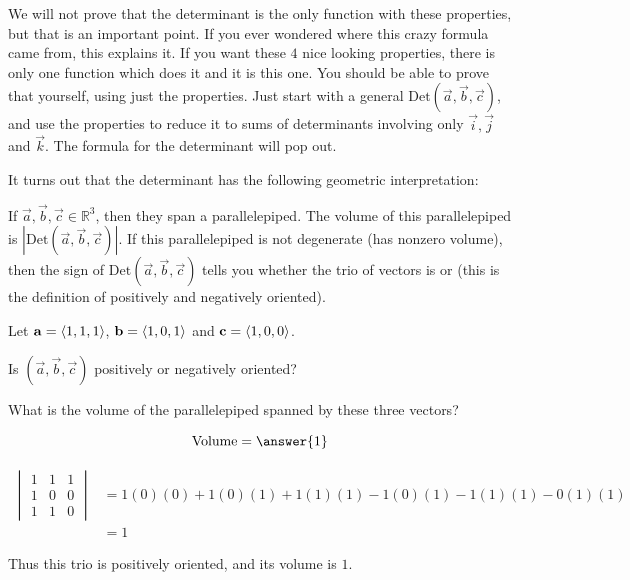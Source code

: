 \documentclass{ximera}
\begin{document}
	We will not prove that the determinant is the only function with these properties, but that is an important point.  If you ever wondered where this crazy formula came from, this explains it.  If you want these $4$ nice looking properties, there is only one function which does it and it is this one.  You should be able to prove that yourself, using just the properties.  Just start with a general $\textrm{Det}(\vec{a},\vec{b},\vec{c}) $, and use the properties to reduce it to sums of determinants involving only $\vec{i},\vec{j}$ and $\vec{k}$.  The formula for the determinant will pop out.  
	
	It turns out that the determinant has the following geometric interpretation:
	
	\begin{theorem}
		If $\vec{a},\vec{b},\vec{c} \in \mathbb{R}^3$, then they span a parallelepiped. The volume of this parallelepiped is $\left|\textrm{Det}(\vec{a},\vec{b},\vec{c})\right|$. If this parallelepiped is not degenerate (has nonzero volume), then the sign of $\textrm{Det}(\vec{a},\vec{b},\vec{c})$ tells you whether the trio of vectors is  or  (this is the definition of positively and negatively oriented).
	\end{theorem} 
	
	\begin{question}
		Let $\mathbf{a} = \left\langle 1,1,1\right\rangle$, $\mathbf{b} = \left\langle 1,0,1\right\rangle$ and $\mathbf{c} = \left\langle 1,0,0\right\rangle$.
		
		Is $(\vec{a},\vec{b},\vec{c})$ positively or negatively oriented?
		
		\begin{multipleChoice}
		\end{multipleChoice}
		
		What is the volume of the parallelepiped spanned by these three vectors?
		
		\[
		\textrm{Volume} = \answer{1}
		\]
		
		\begin{hint}
			\begin{align*}
				\begin{vmatrix}
					1 & 1 & 1\\
					1 & 0 & 0\\
					1 & 1 & 0
				\end{vmatrix} &=
				1(0)(0)+1(0)(1)+1(1)(1)-1(0)(1)-1(1)(1)-0(1)(1)\\
				&=1
			\end{align*}
			
			Thus this trio is positively oriented, and its volume is $1$.
		\end{hint}
	\end{question}
	
\end{document}
